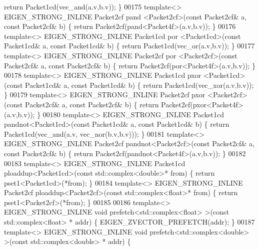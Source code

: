 \begin{DoxyCode}
{      return} Packet1cd(vec\_and(a.v,b.v)); \}
00175 \textcolor{keyword}{template}<> EIGEN\_STRONG\_INLINE Packet2cf pand   <Packet2cf>(\textcolor{keyword}{const} Packet2cf& a, \textcolor{keyword}{const} Packet2cf& b) \{ \textcolor{keywordflow}{
      return} Packet2cf(pand<Packet4f>(a.v,b.v)); \}
00176 \textcolor{keyword}{template}<> EIGEN\_STRONG\_INLINE Packet1cd por    <Packet1cd>(\textcolor{keyword}{const} Packet1cd& a, \textcolor{keyword}{const} Packet1cd& b) \{ \textcolor{keywordflow}{
      return} Packet1cd(vec\_or(a.v,b.v)); \}
00177 \textcolor{keyword}{template}<> EIGEN\_STRONG\_INLINE Packet2cf por    <Packet2cf>(\textcolor{keyword}{const} Packet2cf& a, \textcolor{keyword}{const} Packet2cf& b) \{ \textcolor{keywordflow}{
      return} Packet2cf(por<Packet4f>(a.v,b.v)); \}
00178 \textcolor{keyword}{template}<> EIGEN\_STRONG\_INLINE Packet1cd pxor   <Packet1cd>(\textcolor{keyword}{const} Packet1cd& a, \textcolor{keyword}{const} Packet1cd& b) \{ \textcolor{keywordflow}{
      return} Packet1cd(vec\_xor(a.v,b.v)); \}
00179 \textcolor{keyword}{template}<> EIGEN\_STRONG\_INLINE Packet2cf pxor   <Packet2cf>(\textcolor{keyword}{const} Packet2cf& a, \textcolor{keyword}{const} Packet2cf& b) \{ \textcolor{keywordflow}{
      return} Packet2cf(pxor<Packet4f>(a.v,b.v)); \}
00180 \textcolor{keyword}{template}<> EIGEN\_STRONG\_INLINE Packet1cd pandnot<Packet1cd>(\textcolor{keyword}{const} Packet1cd& a, \textcolor{keyword}{const} Packet1cd& b) \{ \textcolor{keywordflow}{
      return} Packet1cd(vec\_and(a.v, vec\_nor(b.v,b.v))); \}
00181 \textcolor{keyword}{template}<> EIGEN\_STRONG\_INLINE Packet2cf pandnot<Packet2cf>(\textcolor{keyword}{const} Packet2cf& a, \textcolor{keyword}{const} Packet2cf& b) \{ \textcolor{keywordflow}{
      return} Packet2cf(pandnot<Packet4f>(a.v,b.v)); \}
00182 
00183 \textcolor{keyword}{template}<> EIGEN\_STRONG\_INLINE Packet1cd ploaddup<Packet1cd>(\textcolor{keyword}{const} std::complex<double>*     from) \{  \textcolor{keywordflow}{
      return} pset1<Packet1cd>(*from); \}
00184 \textcolor{keyword}{template}<> EIGEN\_STRONG\_INLINE Packet2cf ploaddup<Packet2cf>(\textcolor{keyword}{const} std::complex<float>*      from) \{  \textcolor{keywordflow}{
      return} pset1<Packet2cf>(*from); \}
00185 
00186 \textcolor{keyword}{template}<> EIGEN\_STRONG\_INLINE \textcolor{keywordtype}{void} prefetch<std::complex<float> >(\textcolor{keyword}{const} std::complex<float> *     addr) \{ 
      EIGEN\_ZVECTOR\_PREFETCH(addr); \}
00187 \textcolor{keyword}{template}<> EIGEN\_STRONG\_INLINE \textcolor{keywordtype}{void} prefetch<std::complex<double> >(\textcolor{keyword}{const} std::complex<double> *   addr) \{ 

\end{DoxyCode}
